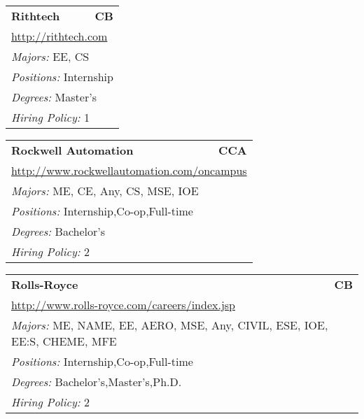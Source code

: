 \documentclass[twoside]{article}
\begin{document}
\begin{center}
\begin{multicols}{3}
\begin{FlushLeft}
\begin{minipage}{.9\columnwidth}
\end{minipage}
 
\begin{minipage}{.9\columnwidth}\begin{tabularx}{.95\columnwidth}{Xr}
                 {\Large\bf Rithtech} & {\Large\bf CB}\\
    \multicolumn{2}{p{.95\columnwidth}}{\url{http://rithtech.com}}\\
    \multicolumn{2}{p{.95\columnwidth}}{\emph{Majors:} EE, CS}\\
    \multicolumn{2}{p{.95\columnwidth}}{\emph{Positions:} Internship}\\
    \multicolumn{2}{p{.95\columnwidth}}{\emph{Degrees:} Master's}\\
    \multicolumn{2}{p{.95\columnwidth}}{\emph{Hiring Policy:} 1}\\
    \end{tabularx}
    
\end{minipage}
 
\begin{minipage}{.9\columnwidth}\begin{tabularx}{.95\columnwidth}{Xr}
                 {\Large\bf Rockwell Automation} & {\Large\bf CCA}\\
    \multicolumn{2}{p{.95\columnwidth}}{\url{http://www.rockwellautomation.com/oncampus}}\\
    \multicolumn{2}{p{.95\columnwidth}}{\emph{Majors:} ME, CE, Any, CS, MSE, IOE}\\
    \multicolumn{2}{p{.95\columnwidth}}{\emph{Positions:} Internship,Co-op,Full-time}\\
    \multicolumn{2}{p{.95\columnwidth}}{\emph{Degrees:} Bachelor's}\\
    \multicolumn{2}{p{.95\columnwidth}}{\emph{Hiring Policy:} 2}\\
    \end{tabularx}
    
\end{minipage}
 
\begin{minipage}{.9\columnwidth}\begin{tabularx}{.95\columnwidth}{Xr}
                 {\Large\bf Rolls-Royce} & {\Large\bf CB}\\
    \multicolumn{2}{p{.95\columnwidth}}{\url{http://www.rolls-royce.com/careers/index.jsp}}\\
    \multicolumn{2}{p{.95\columnwidth}}{\emph{Majors:} ME, NAME, EE, AERO, MSE, Any, CIVIL, ESE, IOE, EE:S, CHEME, MFE}\\
    \multicolumn{2}{p{.95\columnwidth}}{\emph{Positions:} Internship,Co-op,Full-time}\\
    \multicolumn{2}{p{.95\columnwidth}}{\emph{Degrees:} Bachelor's,Master's,Ph.D.}\\
    \multicolumn{2}{p{.95\columnwidth}}{\emph{Hiring Policy:} 2}\\
    \end{tabularx}
    

\end{minipage}
\end{FlushLeft}
\end{multicols}
\end{center}
\end{document}
